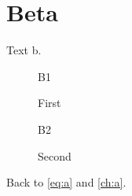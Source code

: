 \chapter{Beta}
Text b.
\begin{figure}[htb]\centering B1\caption{First}\label{fig:b1}\end{figure}
\begin{figure}[htb]\centering B2\caption{Second}\label{fig:b2}\end{figure}
Back to \cref{eq:a} and \cref{ch:a}.
